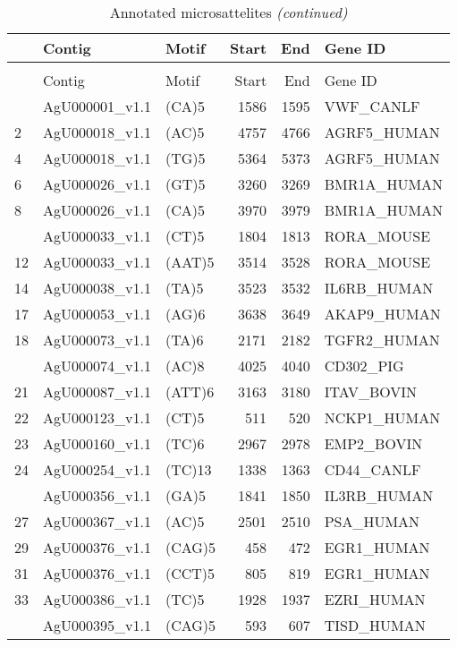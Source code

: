 \documentclass[]{article}
\begin{document}
\begin{longtable}[t]{lllrrl}
\caption{\label{tab:unnamed-chunk-9}Annotated microsattelites}\\
\toprule
  & Contig & Motif & Start & End & Gene ID\\
\midrule
\endfirsthead
\caption[]{Annotated microsattelites \textit{(continued)}}\\
\toprule
  & Contig & Motif & Start & End & Gene ID\\
\midrule
\endhead
\
\endfoot
\bottomrule
\endlastfoot
1 & AgU000001\_v1.1 & (CA)5 & 1586 & 1595 & VWF\_CANLF\\
2 & AgU000018\_v1.1 & (AC)5 & 4757 & 4766 & AGRF5\_HUMAN\\
4 & AgU000018\_v1.1 & (TG)5 & 5364 & 5373 & AGRF5\_HUMAN\\
6 & AgU000026\_v1.1 & (GT)5 & 3260 & 3269 & BMR1A\_HUMAN\\
8 & AgU000026\_v1.1 & (CA)5 & 3970 & 3979 & BMR1A\_HUMAN\\
\addlinespace
10 & AgU000033\_v1.1 & (CT)5 & 1804 & 1813 & RORA\_MOUSE\\
12 & AgU000033\_v1.1 & (AAT)5 & 3514 & 3528 & RORA\_MOUSE\\
14 & AgU000038\_v1.1 & (TA)5 & 3523 & 3532 & IL6RB\_HUMAN\\
17 & AgU000053\_v1.1 & (AG)6 & 3638 & 3649 & AKAP9\_HUMAN\\
18 & AgU000073\_v1.1 & (TA)6 & 2171 & 2182 & TGFR2\_HUMAN\\
\addlinespace
20 & AgU000074\_v1.1 & (AC)8 & 4025 & 4040 & CD302\_PIG\\
21 & AgU000087\_v1.1 & (ATT)6 & 3163 & 3180 & ITAV\_BOVIN\\
22 & AgU000123\_v1.1 & (CT)5 & 511 & 520 & NCKP1\_HUMAN\\
23 & AgU000160\_v1.1 & (TC)6 & 2967 & 2978 & EMP2\_BOVIN\\
24 & AgU000254\_v1.1 & (TC)13 & 1338 & 1363 & CD44\_CANLF\\
\addlinespace
25 & AgU000356\_v1.1 & (GA)5 & 1841 & 1850 & IL3RB\_HUMAN\\
27 & AgU000367\_v1.1 & (AC)5 & 2501 & 2510 & PSA\_HUMAN\\
29 & AgU000376\_v1.1 & (CAG)5 & 458 & 472 & EGR1\_HUMAN\\
31 & AgU000376\_v1.1 & (CCT)5 & 805 & 819 & EGR1\_HUMAN\\
33 & AgU000386\_v1.1 & (TC)5 & 1928 & 1937 & EZRI\_HUMAN\\
\addlinespace
36 & AgU000395\_v1.1 & (CAG)5 & 593 & 607 & TISD\_HUMAN\\

\end{longtable}
\end{document}
